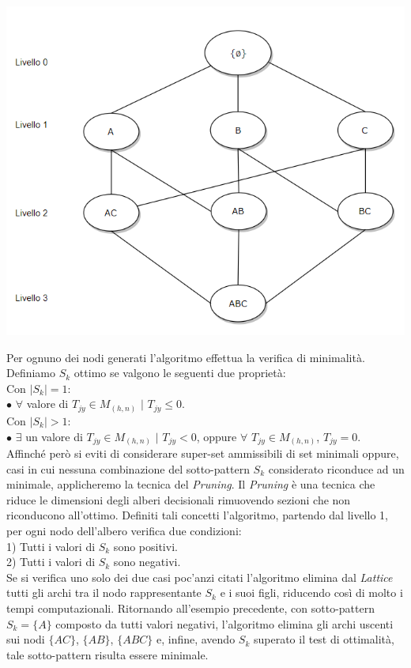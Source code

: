 \begin{center}
\includegraphics[scale = 0.60]{Immagini/Lattice.png}\\
\end{center}
Per ognuno dei nodi generati l'algoritmo effettua la verifica di minimalità. Definiamo $S_k$ ottimo se valgono le seguenti due proprietà:\\Con $|S_k| = 1$:\\$\bullet$ $\forall$ valore di $T_{jy} \in M_{(h,n)}$ $|$ $T_{jy} \leq 0$.\\Con $|S_k| > 1$:\\ $\bullet$ $\exists$ un valore di $T_{jy} \in M_{(h,n)}$ $|$ $T_{jy} < 0$, oppure $ \forall$  $T_{jy} \in M_{(h,n)}$, $T_{jy}= 0 $.\\ Affinché però si eviti di considerare super-set ammissibili di set minimali oppure, casi in cui nessuna combinazione del sotto-pattern $S_k$ considerato riconduce ad un minimale, applicheremo la tecnica del \emph{Pruning}. Il \emph{Pruning} è una tecnica che riduce le dimensioni degli alberi decisionali rimuovendo sezioni che non riconducono all'ottimo. Definiti tali concetti l'algoritmo, partendo dal livello 1, per ogni nodo dell'albero verifica due condizioni:\\1) Tutti i valori di $S_k$ sono positivi.\\2) Tutti i valori di $S_k$ sono negativi.\\Se si verifica uno solo dei due casi poc'anzi citati l'algoritmo elimina dal \emph{Lattice} tutti gli archi tra il nodo rappresentante $S_k$ e i suoi figli, riducendo così di molto i tempi computazionali. Ritornando all'esempio precedente, con sotto-pattern $S_k = \{A\}$ composto da tutti valori negativi, l'algoritmo elimina gli archi uscenti sui nodi $\{AC\}$, $\{AB\}$, $\{ABC\}$ e, infine, avendo $S_k$ superato il test di ottimalità, tale sotto-pattern risulta essere minimale.\\
